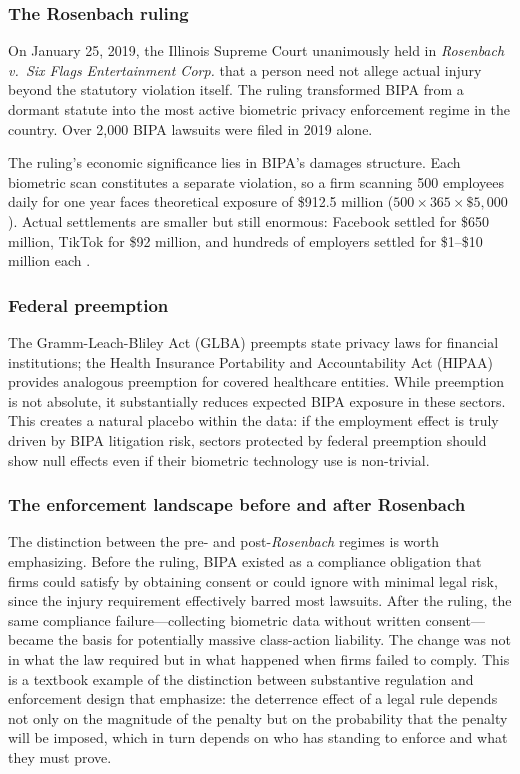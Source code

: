 \documentclass[12pt]{article}
\begin{document}
\subsubsection*{The Rosenbach ruling} On January 25, 2019, the Illinois Supreme Court unanimously held in \textit{Rosenbach v.\ Six Flags Entertainment Corp.} that a person need not allege actual injury beyond the statutory violation itself. The ruling transformed BIPA from a dormant statute into the most active biometric privacy enforcement regime in the country. Over 2,000 BIPA lawsuits were filed in 2019 alone.

The ruling's economic significance lies in BIPA's damages structure. Each biometric scan constitutes a separate violation, so a firm scanning 500 employees daily for one year faces theoretical exposure of \$912.5 million ($500 \times 365 \times \$5{,}000$). Actual settlements are smaller but still enormous: Facebook settled for \$650 million, TikTok for \$92 million, and hundreds of employers settled for \$1--\$10 million each \citep{goldsmith2023}.

\subsubsection*{Federal preemption} The Gramm-Leach-Bliley Act (GLBA) preempts state privacy laws for financial institutions; the Health Insurance Portability and Accountability Act (HIPAA) provides analogous preemption for covered healthcare entities. While preemption is not absolute, it substantially reduces expected BIPA exposure in these sectors. This creates a natural placebo within the data: if the employment effect is truly driven by BIPA litigation risk, sectors protected by federal preemption should show null effects even if their biometric technology use is non-trivial.

\subsubsection*{The enforcement landscape before and after Rosenbach} The distinction between the pre- and post-\textit{Rosenbach} regimes is worth emphasizing. Before the ruling, BIPA existed as a compliance obligation that firms could satisfy by obtaining consent or could ignore with minimal legal risk, since the injury requirement effectively barred most lawsuits. After the ruling, the same compliance failure---collecting biometric data without written consent---became the basis for potentially massive class-action liability. The change was not in what the law required but in what happened when firms failed to comply. This is a textbook example of the distinction between substantive regulation and enforcement design that \citet{polinskys2000} emphasize: the deterrence effect of a legal rule depends not only on the magnitude of the penalty but on the probability that the penalty will be imposed, which in turn depends on who has standing to enforce and what they must prove.
\end{document}

